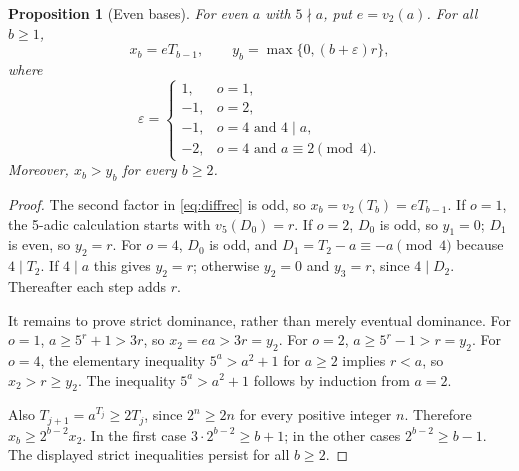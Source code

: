 \documentclass[11pt,letterpaper]{article}
\numberwithin{equation}{section}
\newtheorem{proposition}[theorem]{Proposition}
\theoremstyle{definition}
\begin{document}
\begin{proposition}[Even bases]\label{prop:evenprofiles}
For even $a$ with $5\nmid a$, put $e=v_2(a)$. For all $b\geq1$,
\begin{equation}\label{eq:evenprofiles}
 x_b=eT_{b-1},\qquad y_b=\max\{0,(b+\varepsilon)r\},
\end{equation}
where
\begin{equation}\label{eq:epsiloneven}
\varepsilon=\begin{cases}
1,&o=1,\\
-1,&o=2,\\
-1,&o=4\text{ and }4\mid a,\\
-2,&o=4\text{ and }a\equiv2\pmod4.
\end{cases}
\end{equation}
Moreover, $x_b>y_b$ for every $b\geq2$.
\end{proposition}
\begin{proof}
The second factor in \eqref{eq:diffrec} is odd, so
$x_b=v_2(T_b)=eT_{b-1}$. If $o=1$, the 5-adic calculation starts with
$v_5(D_0)=r$. If $o=2$, $D_0$ is odd, so $y_1=0$; $D_1$ is even, so
$y_2=r$. For $o=4$, $D_0$ is odd, and
$D_1=T_2-a\equiv-a\pmod4$ because $4\mid T_2$. If $4\mid a$ this gives
$y_2=r$; otherwise $y_2=0$ and $y_3=r$, since $4\mid D_2$. Thereafter each
step adds $r$.

It remains to prove strict dominance, rather than merely eventual dominance.
For $o=1$, $a\geq5^r+1>3r$, so $x_2=ea>3r=y_2$. For $o=2$,
$a\geq5^r-1>r=y_2$. For $o=4$, the elementary inequality
$5^a>a^2+1$ for $a\geq2$ implies $r<a$, so $x_2>r\geq y_2$.
The inequality $5^a>a^2+1$ follows by induction from $a=2$.

Also $T_{j+1}=a^{T_j}\geq2T_j$, since $2^n\geq2n$ for every positive
integer $n$. Therefore $x_b\geq2^{b-2}x_2$. In the first case
$3\cdot2^{b-2}\geq b+1$; in the other cases $2^{b-2}\geq b-1$.
The displayed strict inequalities persist for all $b\geq2$.
\end{proof}
\end{document}
